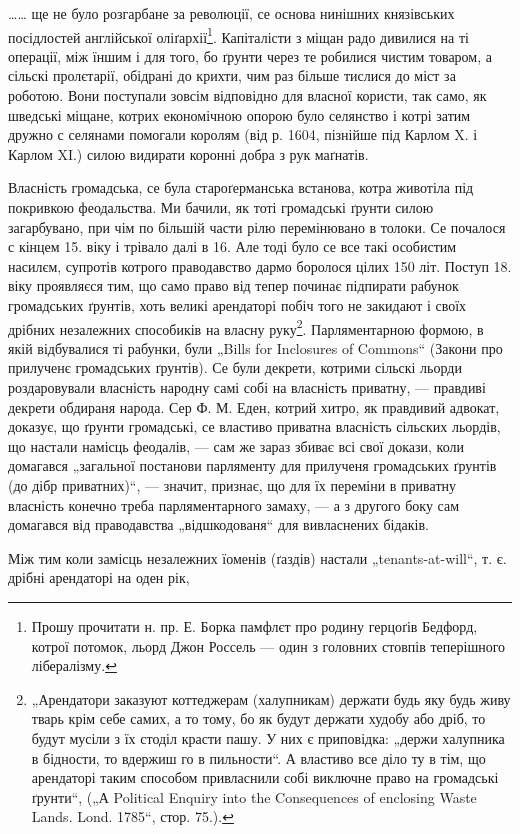 \dots{}\dots{}\parcont{}
ще не було розгарбане за революції, се основа нинішних
князівських посідлостей англійської оліґархії\footnote{
Прошу прочитати н. пр. Е. Борка памфлєт про родину герцоґів
Бедфорд, котрої потомок, льорд Джон Россель — один з головних стовпів
теперішного лібералізму.
}. Капіталісти
з міщан радо дивилися на ті операції, між їншим і для
того, бо ґрунти через те робилися чистим товаром, а сільскі
пролєтарії, обідрані до крихти, чим раз більше тислися
до міст за роботою. Вони поступали зовсім відповідно для
власної користи, так само, як шведські міщане, котрих економічною
опорою було селянство і котрі затим дружно с селянами
помогали королям (від р. 1604, пізнійше під Карлом
X. і Карлом XI.) силою видирати коронні добра з рук
маґнатів.

Власність громадська, се була староґерманська встанова,
котра животіла під покривкою феодальства. Ми бачили,
як тоті громадські ґрунти силою загарбувано, при
чім по більшій части рілю перемінювано в толоки. Се почалося
с кінцем 15. віку і трівало далі в 16. Але тоді було
се все такі особистим насилєм, супротів котрого праводавство
дармо боролося цілих 150 літ. Поступ 18. віку проявляєся
тим, що само право від тепер починає підпирати рабунок
громадських ґрунтів, хоть великі арендаторі побіч
того не закидают і своїх дрібних незалежних способиків на
власну руку\footnote{
„Арендатори заказуют коттеджерам (халупникам) держати будь
яку будь живу тварь крім себе самих, а то тому, бо як будут держати
худобу або дріб, то будут мусіли з їх стоділ красти пашу. У них є приповідка:
„держи халупника в бідности, то вдержиш го в пильности“.
А властиво все діло ту в тім, що арендаторі таким способом привласнили
собі виключне право на громадські ґрунти“, („А Political Enquiry into
the Consequences of enclosing Waste Lands. Lond. 1785“, стор. 75.).
}.  Парляментарною формою, в якій відбувалися
ті рабунки, були „Bills for Inclosures of Commons“ (Закони
про прилученє громадських ґрунтів). Се були декрети, котрими
сільскі льорди роздаровували власність народну самі
собі на власність приватну, — правдиві декрети обдираня
народа. Сер Ф. М. Еден, котрий хитро, як правдивий адвокат,
доказує, що ґрунти громадські, се властиво приватна
власність сільских льордів, що настали намісць феодалів,
— сам же зараз збиває всі свої докази, коли домагався
„загальної постанови парляменту для прилученя громадських
ґрунтів (до дібр приватних)“, — значит, признає, що
для їх переміни в приватну власність конечно треба парляментарного
замаху, — а з другого боку сам домагався
від праводавства „відшкодованя“ для вивласнених бідаків.

Між тим коли замісць незалежних їоменів (ґаздів) настали
„tenants-at-will“, т. є. дрібні арендаторі на оден рік,
\parbreak{}
